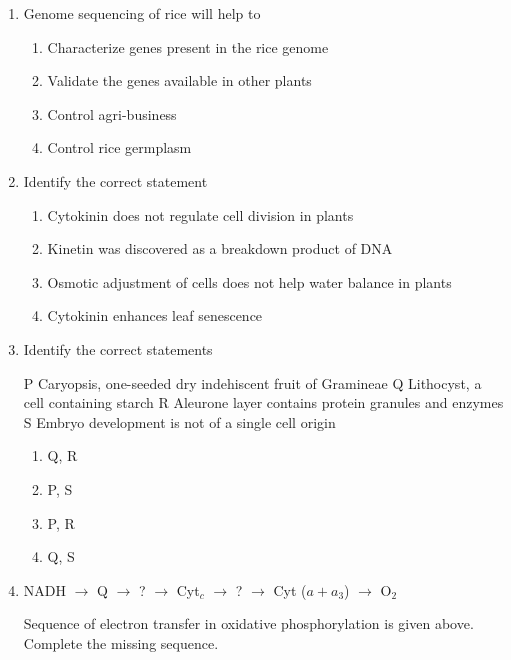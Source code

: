 \documentclass[journal,12pt,onecolumn]{IEEEtran}
\begin{document}
\begin{enumerate}
\item Genome sequencing of rice will help to
\begin{multicols}{2}
\begin{enumerate}[label=(\Alph*)]
    \item Characterize genes present in the rice genome
    \item Validate the genes available in other plants
    \item Control agri-business
    \item Control rice germplasm
\end{enumerate}
\end{multicols}

\item Identify the correct statement
\begin{multicols}{2}
\begin{enumerate}[label=(\Alph*)]
    \item Cytokinin does not regulate cell division in plants
    \item Kinetin was discovered as a breakdown product of DNA
    \item Osmotic adjustment of cells does not help water balance in plants
    \item Cytokinin enhances leaf senescence
\end{enumerate}
\end{multicols}

\item Identify the correct statements

P \quad Caryopsis, one-seeded dry indehiscent fruit of Gramineae  
Q \quad Lithocyst, a cell containing starch  
R \quad Aleurone layer contains protein granules and enzymes  
S \quad Embryo development is not of a single cell origin  

\begin{multicols}{2}
\begin{enumerate}[label=(\Alph*)]
    \item Q, R
    \item P, S
    \item P, R
    \item Q, S
\end{enumerate}
\end{multicols}

\item NADH $\rightarrow$ Q $\rightarrow$ ? $\rightarrow$ Cyt$_c$ $\rightarrow$ ? $\rightarrow$ Cyt ($a + a_3$) $\rightarrow$ O$_2$  

Sequence of electron transfer in oxidative phosphorylation is given above. Complete the missing sequence.


\end{enumerate}
\end{document}
